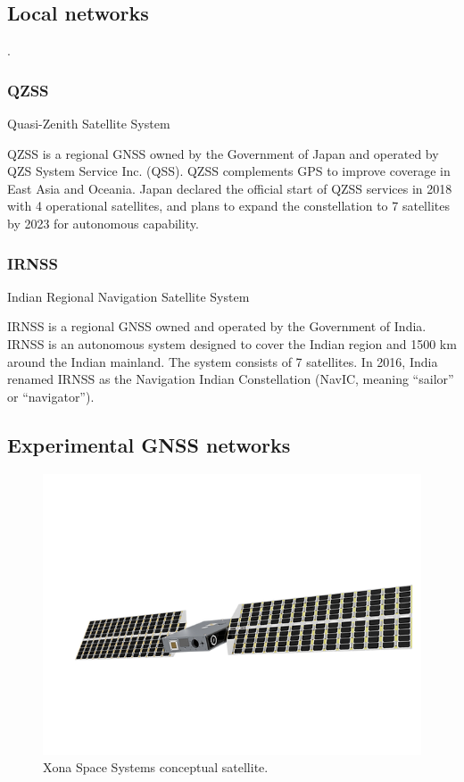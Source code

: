\subsection{Local networks}

.

\subsubsection{QZSS}

Quasi-Zenith Satellite System \cite{qzss}

QZSS is a regional GNSS owned by the Government of Japan and operated by QZS System Service Inc. (QSS). QZSS complements GPS to improve coverage in East Asia and Oceania. Japan declared the official start of QZSS services in 2018 with 4 operational satellites, and plans to expand the constellation to 7 satellites by 2023 for autonomous capability.

\subsubsection{IRNSS}

Indian Regional Navigation Satellite System \cite{irnss}

IRNSS is a regional GNSS owned and operated by the Government of India. IRNSS is an autonomous system designed to cover the Indian region and 1500 km around the Indian mainland. The system consists of 7 satellites. In 2016, India renamed IRNSS as the Navigation Indian Constellation (NavIC, meaning ``sailor'' or ``navigator'').

\subsection{Experimental GNSS networks}

\cite{aarestad2020}

\begin{figure}[!ht]
    \begin{center}
        \includegraphics[width=\columnwidth]{figures/xona-satellite}
        \caption{Xona Space Systems conceptual satellite.}
        \label{fig:xona-satellite}
    \end{center}
\end{figure}
